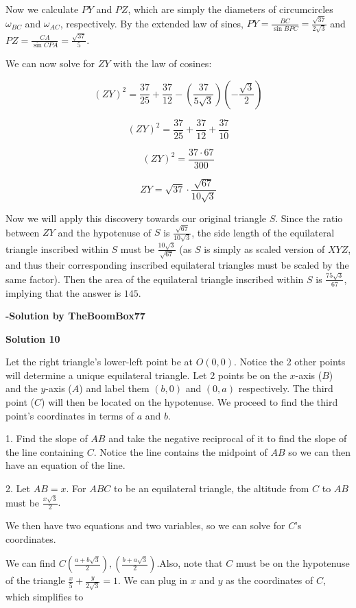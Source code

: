 \begin{enumerate}
 Now we calculate $PY$ and $PZ$, which are simply the diameters of circumcircles $\omega_{BC}$ and $\omega_{AC}$, respectively. By the extended law of sines, $PY = \frac{BC}{\sin{BPC}} = \frac{\sqrt{37}}{2\sqrt{3}}$ and $PZ = \frac{CA}{\sin{CPA}} = \frac{\sqrt{37}}{5}$.

 We can now solve for $ZY$ with the law of cosines:

 
 \[(ZY)^2 = \frac{37}{25} + \frac{37}{12} - \left(\frac{37}{5\sqrt{3}}\right)\left(-\frac{\sqrt{3}}{2}\right)\]

 \[(ZY)^2 = \frac{37}{25} + \frac{37}{12} + \frac{37}{10}\]

 \[(ZY)^2 = \frac{37 \cdot 67}{300}\]

 \[ZY = \sqrt{37} \cdot \frac{\sqrt{67}}{10\sqrt{3}}\]

 Now we will apply this discovery towards our original triangle $S$. Since the ratio between $ZY$ and the hypotenuse of $S$ is $\frac{\sqrt{67}}{10\sqrt{3}}$, the side length of the equilateral triangle inscribed within $S$ must be $\frac{10\sqrt{3}}{\sqrt{67}}$ (as $S$ is simply as scaled version of $XYZ$, and thus their corresponding inscribed equilateral triangles must be scaled by the same factor). Then the area of the equilateral triangle inscribed within $S$ is $\frac{75\sqrt{3}}{67}$, implying that the answer is $\boxed{145}$.

 \textbf{-Solution by TheBoomBox77}

 



\textbf{Solution 10}

Let the right triangle's lower-left point be at $O(0,0)$. Notice the 2 other points will determine a unique equilateral triangle. Let 2 points be on the $x$-axis ($B$) and the $y$-axis ($A$) and label them $(b, 0)$ and $(0, a)$ respectively.  The third point ($C$) will then be located on the hypotenuse.  We proceed to find the third point's coordinates in terms of $a$ and $b$. 

 
1. Find the slope of $AB$ and take the negative reciprocal of it to find the slope of the line containing $C$.  Notice the line contains the midpoint of $AB$ so we can then have an equation of the line.

 2. Let $AB=x.$  For $ABC$ to be an equilateral triangle, the altitude from $C$ to $AB$ must be $\frac{x\sqrt{3}}{2}.$

 We then have two equations and two variables, so we can solve for $C$'s coordinates. 

 We can find $C(\frac{a+b\sqrt{3}}{2}), (\frac{b+a\sqrt{3}}{2}).$Also, note that $C$ must be on the hypotenuse of the triangle $\frac{x}{5}+\frac{y}{2\sqrt{3}}=1.$  We can plug in $x$ and $y$ as the coordinates of $C$,  which simplifies to 


\end{enumerate}
